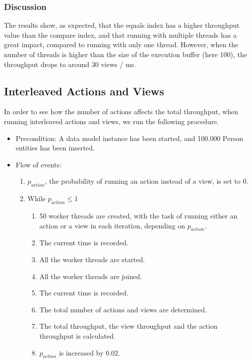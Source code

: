 \subsubsection{Discussion}

The results show, as expected, that the equals index has a higher
throughput value than the compare index, and that running with multiple
threads has a great impact, compared to running with only one thread.
However, when the number of threads is higher than the size of the
execution buffer (here 100), the throughput drops to around 30 views
/ ms.


\subsection{Interleaved Actions and Views}

In order to see how the number of actions affects the total throughput,
when running interleaved actions and views, we run the following procedure.
\begin{itemize}
\item Precondition: A data model instance has been started, and 100.000
Person entities has been inserted.
\item Flow of events:

\begin{enumerate}
\item $p_{action}$, the probability of running an action instead of a view,
is set to 0.
\item While \emph{$p_{action}\leq1$}

\begin{enumerate}
\item 50 worker threads are created, with the task of running either an
action or a view in each iteration, depending on $p_{action}$.
\item The current time is recorded.
\item All the worker threads are started.
\item All the worker threads are joined.
\item The current time is recorded.
\item The total number of actions and views are determined.
\item The total throughput, the view throughput and the action throughput
is calculated.
\item $p_{action}$ is increased by 0.02.
\end{enumerate}
\end{enumerate}
\end{itemize}

